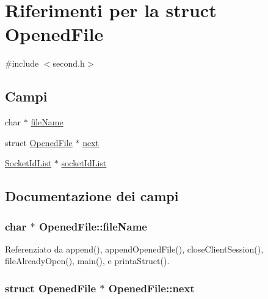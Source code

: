 \hypertarget{structOpenedFile}{}\section{Riferimenti per la struct Opened\+File}
\label{structOpenedFile}


{\ttfamily \#include $<$second.\+h$>$}

\subsection*{Campi}
\begin{DoxyCompactItemize}
\item 
char $\ast$ \hyperlink{structOpenedFile_abcff0610dfa8b1e3836b3f5bac40c8f5}{file\+Name}
\item 
struct \hyperlink{structOpenedFile}{Opened\+File} $\ast$ \hyperlink{structOpenedFile_a9b8c8b995cdda6da249a6ce9a9df98b2}{next}
\item 
\hyperlink{structSocketIdList}{Socket\+Id\+List} $\ast$ \hyperlink{structOpenedFile_afae954d6877e7a6345a696d29355f29e}{socket\+Id\+List}
\end{DoxyCompactItemize}


\subsection{Documentazione dei campi}
\hypertarget{structOpenedFile_abcff0610dfa8b1e3836b3f5bac40c8f5}{}
\subsubsection[{file\+Name}]{\setlength{\rightskip}{0pt plus 5cm}char $\ast$ Opened\+File\+::file\+Name}\label{structOpenedFile_abcff0610dfa8b1e3836b3f5bac40c8f5}


Referenziato da append(), append\+Opened\+File(), close\+Client\+Session(), file\+Already\+Open(), main(), e printa\+Struct().

\hypertarget{structOpenedFile_a9b8c8b995cdda6da249a6ce9a9df98b2}{}
\subsubsection[{next}]{\setlength{\rightskip}{0pt plus 5cm}struct {\bf Opened\+File} $\ast$ Opened\+File\+::next}\label{structOpenedFile_a9b8c8b995cdda6da249a6ce9a9df98b2}



